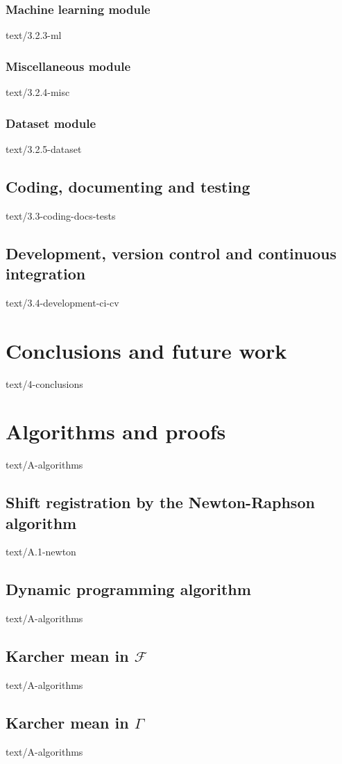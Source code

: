 \documentclass[epsbased,copyleft,final,loe, lof,extendedindex,firstnumbered,tfg,english]{tfgtfmthesisuam}
\begin{document}
  \subsection{Machine learning module\label{SEC:MLMOD}}{text/3.2.3-ml}
  \subsection{Miscellaneous module\label{SEC:MISCMOD}}{text/3.2.4-misc}
  \subsection{Dataset module\label{SEC:DATAMOD}}{text/3.2.5-dataset}
\section{Coding, documenting and testing\label{SEC:CODING}}{text/3.3-coding-docs-tests}
\section{Development, version control and continuous integration\label{SEC:DEVELOPMENT}}{text/3.4-development-ci-cv}

\chapter{Conclusions and future work\label{CAP:CONCLUSIONS}}{text/4-conclusions}

\appendix

\chapter{Algorithms and proofs\label{CAP:ALGORITHMS}}{text/A-algorithms}
  \section{Shift registration by the Newton-Raphson algorithm\label{SEC:NEWTON}}{text/A.1-newton}
  \section{Dynamic programming algorithm\label{SEC:DPA}}{text/A-algorithms}
  \section{Karcher mean in $\mathcal{F}$\label{SEC:KARCHERF}}{text/A-algorithms}
  \section{Karcher mean in $\Gamma$\label{SEC:KARCHERG}}{text/A-algorithms}
\end{document}
